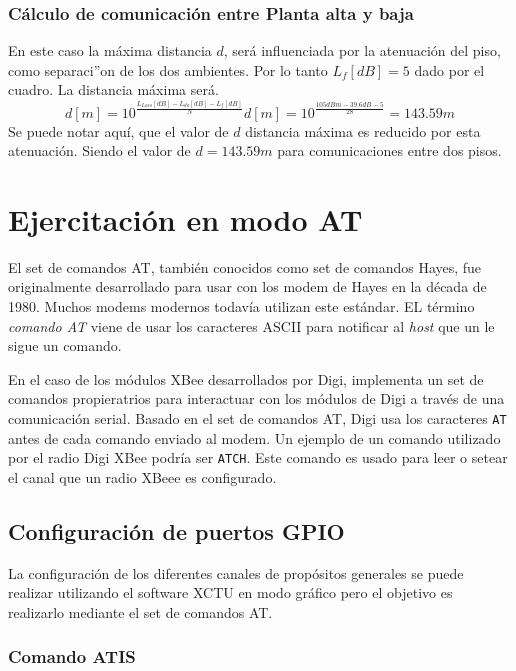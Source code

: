 \documentclass[11pt,oneside,spanish,a4paper]{article}
\begin{document}
\subsubsection{C\'alculo de comunicaci\'on entre Planta alta y baja}
En este caso la m\'axima distancia $d$, ser\'a influenciada por la atenuaci\'on del piso, como separaci''on de los dos ambientes. Por lo tanto $L_{f}[dB]=5$ dado por el cuadro. La distancia m\'axima ser\'a.
\begin{equation*}
\label{eq:calculod}
d[m] = 10 ^{\frac{L_{Loss}[dB] - L_{do}[dB] - L_{f}[dB]}{N}} 
d[m] = 10 ^{\frac{105dBm - 39.6dB - 5}{28}} = 143.59m
\end{equation*}
Se puede notar aqu\'i, que el valor de $d$ distancia m\'axima es
reducido por esta atenuaci\'on. Siendo el valor de $d=143.59m$ para
comunicaciones entre dos pisos.

\section{Ejercitación en modo AT}
\label{sec:AT}

El set de comandos AT, también conocidos como set de comandos Hayes,
fue originalmente desarrollado para usar con los modem de Hayes en la
década de 1980. Muchos modems modernos todavía utilizan este
estándar. EL término \emph{comando AT}  viene de usar los caracteres
ASCII para notificar al \textsl{host}  que un le sigue un comando. 

En el caso de los módulos XBee desarrollados por Digi, implementa un
set de comandos propieratrios para interactuar con los módulos de
Digi a través de una comunicación serial. Basado en el set de comandos
AT, Digi usa los caracteres \texttt{AT} antes de cada comando enviado
al modem. Un ejemplo de un comando utilizado por el radio Digi XBee
podría ser \texttt{ATCH}. Este comando es usado para leer o setear el
canal que un radio XBeee es configurado\cite{at-cmds}.

\subsection{Configuración de puertos GPIO}
\label{sec:config-at}

La configuración de los diferentes canales de propósitos generales se
puede realizar utilizando el software XCTU en modo gráfico pero el
objetivo es realizarlo mediante el set de comandos AT. 

\subsubsection{Comando ATIS}
\label{sec:atis}
\end{document}

